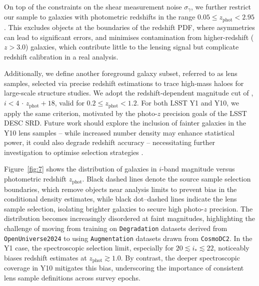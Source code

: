 On top of the constraints on the shear measurement noise \(\sigma_\gamma\), we further restrict our sample to galaxies with photometric redshifts in the range \(0.05 \le z_{\mathrm{phot}} < 2.95\). This excludes objects at the boundaries of the redshift PDF, where asymmetries can lead to significant errors, and minimises contamination from higher-redshift (\(z > 3.0\)) galaxies, which contribute little to the lensing signal but complicate redshift calibration in a real analysis.

Additionally, we define another foreground galaxy subset, referred to as lens samples, selected via precise redshift estimations to trace high‐mass haloes for large‐scale structure studies\citep{2021A&A...646A.140H, 2022PhRvD.105b3520A, 2023A&A...675A.189D, 2023PhRvD.108l3521S, 2023PhRvD.108l3517M}. We adopt the redshift‐dependent magnitude cut of \citet{2021PhRvD.103d3503P}, \( i < 4 \,\cdot\, z_{\mathrm{phot}} + 18 \), valid for \(0.2 \le z_{\mathrm{phot}} < 1.2\). For both LSST Y1 and Y10, we apply the same criterion, motivated by the photo-\(z\) precision goals of the LSST DESC SRD. Future work should explore the inclusion of fainter galaxies in the Y10 lens samples -- while increased number density may enhance statistical power, it could also degrade redshift accuracy -- necessitating further investigation to optimise selection strategies \citep{2023ApJ...950...49M}.

Figure~\ref{fig:7} shows the distribution of galaxies in \(i\)-band magnitude versus photometric redshift \(z_{\mathrm{phot}}\). Black dashed lines denote the source sample selection boundaries, which remove objects near analysis limits to prevent bias in the conditional density estimates, while black dot–dashed lines indicate the lens sample selection, isolating brighter galaxies to secure high photo-\(z\) precision. The distribution becomes increasingly disordered at faint magnitudes, highlighting the challenge of moving from training on \texttt{Degradation} datasets derived from \texttt{OpenUniverse2024} to using \texttt{Augmentation} datasets drawn from \texttt{CosmoDC2}. In the Y1 case, the spectroscopic selection limit, especially for \(20  \lesssim i_\ast \lesssim 22 \), noticeably biases redshift estimates at \(z_{\mathrm{phot}} \gtrsim 1.0\). By contrast, the deeper spectroscopic coverage in Y10 mitigates this bias, underscoring the importance of consistent lens sample definitions across survey epochs.  